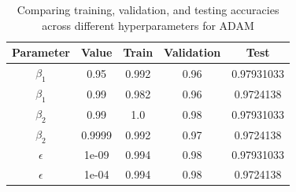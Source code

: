 \documentclass[12pt]{article}
\begin{document}
\begin{center}
  \begin{table}[h]
    \centering
    \begin{tabular}{||c c c c c||}
      \hline
      Parameter  & Value  & Train & Validation & Test       \\
      \hline\hline
      $\beta_1$  & 0.95   & 0.992 & 0.96       & 0.97931033 \\
      $\beta_1$  & 0.99   & 0.982 & 0.96       & 0.9724138  \\
      \hline

      \hline
      $\beta_2$  & 0.99   & 1.0   & 0.98       & 0.97931033 \\
      $\beta_2$  & 0.9999 & 0.992 & 0.97       & 0.9724138  \\
      \hline

      \hline
      $\epsilon$ & 1e-09  & 0.994 & 0.98       & 0.97931033 \\
      $\epsilon$ & 1e-04  & 0.994 & 0.98       & 0.9724138  \\
      \hline
    \end{tabular}
    \caption{\label{tab: table-name}Comparing training, validation, and testing accuracies across different hyperparameters for ADAM}
  \end{table}
\end{center}
\end{document}
